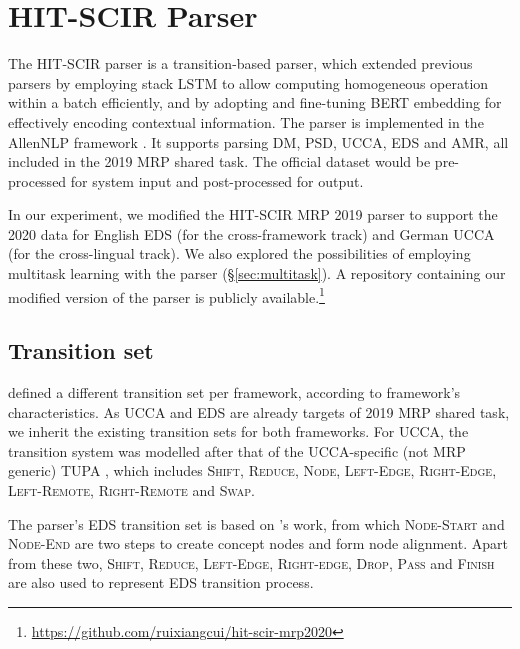 \documentclass[11pt,a4paper]{article}
\begin{document}
\section{HIT-SCIR Parser}\label{sec:hit-scir}
The HIT-SCIR parser \citep{che-etal-2019-hit} is a transition-based parser, which extended previous parsers by employing stack LSTM \cite{dyer2015transition} to allow computing homogeneous operation within a batch efficiently, and by adopting and fine-tuning BERT \citep{devlin-etal-2019-bert} embedding for effectively encoding contextual information.
The parser is implemented in the AllenNLP framework \cite{Gardner2017AllenNLP}.
It supports parsing DM, PSD, UCCA, EDS and AMR, all included in the 2019 MRP shared task. The official dataset would be pre-processed for system input and post-processed for output.

In our experiment, we modified the HIT-SCIR MRP 2019 parser to support the 2020 data for English EDS (for the cross-framework track) and German UCCA (for the cross-lingual track). We also explored the possibilities of employing multitask learning with the parser (\S\ref{sec:multitask}).  A repository containing our modified version of the parser is publicly available.\footnote{\url{https://github.com/ruixiangcui/hit-scir-mrp2020}}

\subsection{Transition set}\label{sec:hit-scir-transitions}

 defined a different transition set per framework, according to framework's characteristics. 
As UCCA and EDS are already targets of 2019  MRP shared task, we inherit the existing transition sets for both frameworks. For UCCA, the transition system was modelled after that of the UCCA-specific (not MRP generic) TUPA \cite{hershcovich2017a}, which includes \textsc{Shift}, \textsc{Reduce}, \textsc{Node}, \textsc{Left-Edge}, \textsc{Right-Edge}, \textsc{Left-Remote}, \textsc{Right-Remote} and \textsc{Swap}.

The parser's EDS transition set is based on \citet{buys-blunsom-2017-robust}'s work, from which \textsc{Node-Start} and \textsc{Node-End} are two steps to create concept nodes and form node alignment. Apart from these two, \textsc{Shift}, \textsc{Reduce}, \textsc{Left-Edge}, \textsc{Right-edge}, \textsc{Drop}, \textsc{Pass} and \textsc{Finish} are also used to represent EDS transition process.
\end{document}
